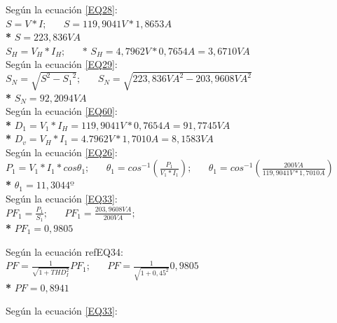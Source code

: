 Según la ecuación \ref{EQ28}: \\

$S = V*I; \;\;\;\;\;\;
S = 119,9041V * 1,8653A$\\

\textbf{* }$S = 223,836VA$\\

$S_{H} = V_{H}*I_{H}; \;\;\;\;\;\;
\textbf{* }S_{H} = 4,7962V * 0,7654A = 3,6710VA$\\

Según la ecuación \ref{EQ29}: \\

$S_{N} = \sqrt{{S}^2 - {{S}_{1}}^2}; \;\;\;\;\;\;
S_{N} =  \sqrt{{223,836VA}^2 - {203,9608VA}^2}$\\

\textbf{* }$S_{N} = 92,2094VA$\\

Según la ecuación \ref{EQ60}: \\

\textbf{* }$D_{1} = V_{1}*I_{H} = 119,9041V * 0,7654A = 91,7745VA$\\

\textbf{* }$D_{v} = V_{H}*I_{1} = 4.7962V *1,7010A = 8,1583VA$\\

Según la ecuación \ref{EQ26}: \\

$P_{1} = V_{1}*I_{1}*cos \theta_{1}; \;\;\;\;\;\; 
\theta_{1} =  cos^{-1}(\frac{P_{1}}{V_{1}*I_{1}}); \;\;\;\;\;\; 
\theta_{1} =  cos^{-1}(\frac{200VA}{119,9041V*1,7010A})$\\

\textbf{* }$\theta_{1} = 11,3044º$\\

Según la ecuación \ref{EQ33}: \\

$PF_{1} = \frac{P_{1}}{S_{1}}; \;\;\;\;\;\; PF_{1} = \frac{203,9608VA}{200VA};$\\

\textbf{* }$PF_{1} = 0,9805$

Según la ecuación ref{EQ34}: \\

$PF=\frac{1}{\sqrt{1+THD^2_{I}}}PF_{1}; \;\;\;\;\;\; PF=\frac{1}{\sqrt{1+0,45^2}}0,9805$ \\

\textbf{* } $PF= 0,8941$

Según la ecuación \ref{EQ33}: \\

